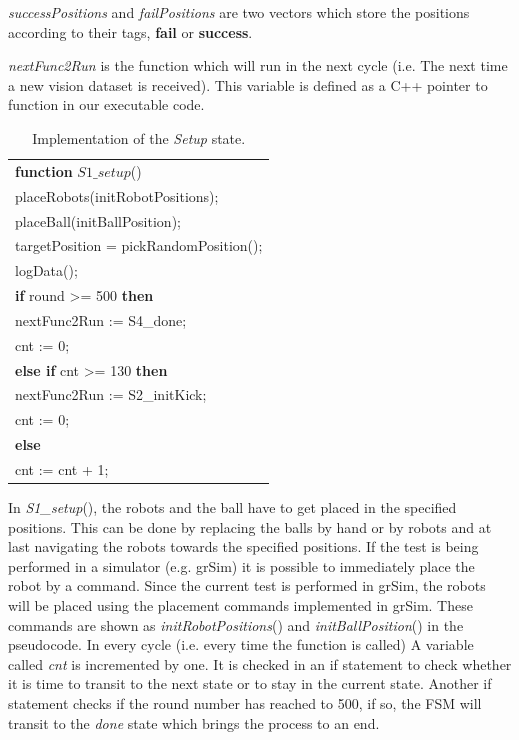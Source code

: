 \documentclass[runningheads]{llncs}
\begin{document}
\textit{successPositions} and \textit{failPositions} are two vectors which store the positions according to their tags, \textbf{fail} or \textbf{success}.

\textit{nextFunc2Run} is the function which will run in the next cycle (i.e. The next time a new vision dataset is received). This variable is defined as a C++ pointer to function in our executable code.


\begin{table}[H]
\caption{Implementation of the \textit{Setup} state.}
\center
\label{table_STATE1_IMP}
\begin{tabular}{|p{10cm}|}
\hline

\textbf{function}
$ S1\_setup$()\\
\quad placeRobots(initRobotPositions);\\
\quad placeBall(initBallPosition);\\
\quad targetPosition = pickRandomPosition();\\
\quad logData();\\
\quad \textbf{if} round >= 500 \textbf{then}\\
\quad\quad nextFunc2Run := S4\_done;\\
\quad\quad cnt := 0;\\
\quad \textbf{else if} cnt >= 130 \textbf{then}\\
\quad\quad nextFunc2Run := S2\_initKick;\\
\quad\quad cnt := 0;\\
\quad \textbf{else}\\
\quad\quad cnt := cnt + 1;\\

\hline
\end{tabular}
\end{table}

In \textit{S1\_setup}(), the robots and the ball have to get placed in the specified positions. This can be done by replacing the balls by hand or by robots and at last navigating the robots towards the specified positions.
If the test is being performed in a simulator (e.g. grSim) it is possible to immediately place the robot by a command. Since the current test is performed in grSim, the robots will be placed using the placement commands implemented in grSim. These commands are shown as \textit{initRobotPositions}() and \textit{initBallPosition}() in the pseudocode. In every cycle (i.e. every time the function is called) A variable called \textit{cnt} is incremented by one. It is checked in an if statement to check whether it is time to transit to the next state or to stay in the current state. Another if statement checks if the round number has reached to 500, if so, the FSM will transit to the \textit{done} state which brings the process to an end.
\end{document}
